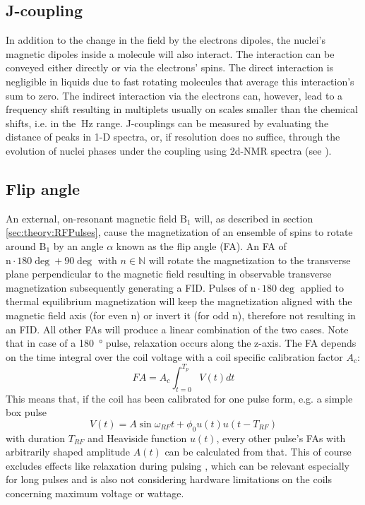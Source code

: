         \subsection{J-coupling}
        In addition to the change in the field by the electrons dipoles, the nuclei's magnetic dipoles inside a molecule will also interact. The interaction can be conveyed either directly or via the electrons' spins. The direct interaction is negligible in liquids due to fast rotating molecules that average this interaction's sum to zero. The indirect interaction via the electrons can, however, lead to a frequency shift resulting in multiplets usually on scales smaller than the chemical shifts, i.e. in the $\SI{}{\hertz}$ range.
        J-couplings can be measured by evaluating the distance of peaks in 1-D spectra, or, if resolution does no suffice, through the evolution of nuclei phases under the coupling using 2d-NMR spectra (see \cite{ottiger_measurement_1998}).
        \subsection{Flip angle}
        An external, on-resonant magnetic field $\mathrm{B}_1$ will, as described in section \ref{sec:theory:RFPulses}, cause the magnetization of an ensemble of spins to rotate around B$_1$ by an angle $\alpha$ known as the flip angle (FA). An FA of $\mathrm n\cdot 180 \deg + 90 \deg$ with $n \in \mathbb{N}$ will rotate the magnetization to the transverse plane perpendicular to the magnetic field resulting in observable transverse magnetization subsequently generating a FID. Pulses of $\mathrm n\cdot 180 \deg$ applied to thermal equilibrium magnetization will keep the magnetization aligned with the magnetic field axis (for even n) or invert it (for odd n), therefore not resulting in an FID. All other FAs will produce a linear combination of the two cases. Note that in case of a \SI{180}{\degree} pulse, relaxation occurs along the z-axis. The FA depends on the time integral over the coil voltage with a coil specific calibration factor $A_c$:
            \begin{equation}
                \label{eq:theory:FA}
                FA = A_c \int_{t=0}^{T_p}{V(t)dt}
            \end{equation}
            This means that, if the coil has been calibrated for one pulse form, e.g. a simple box pulse 
            \begin{equation}
                V(t) = A\sin{\omega_{RF} t + \phi_0} u(t)u(t-T_{RF})
            \end{equation}
            with duration $T_{RF}$ and Heaviside function $u(t)$, every other pulse's FAs with arbitrarily shaped amplitude $A(t)$ can be calculated from that. This of course excludes effects like relaxation during pulsing \cite{wang_factors_2006}, which can be relevant especially for long pulses and is also not considering hardware limitations on the coils concerning maximum voltage or wattage.
